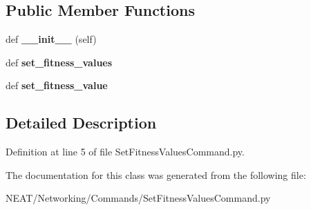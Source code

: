\subsection*{Public Member Functions}
\begin{DoxyCompactItemize}
\item 
def {\bfseries \+\_\+\+\_\+init\+\_\+\+\_\+} (self)\hypertarget{class_n_e_a_t___py_genetics_1_1_n_e_a_t_1_1_networking_1_1_commands_1_1_set_fitness_values_comma81a16061636d0840e697e190c694b7ad_af1878c6d7a7fcb3d42693ebf5ab9a8f9}{}\label{class_n_e_a_t___py_genetics_1_1_n_e_a_t_1_1_networking_1_1_commands_1_1_set_fitness_values_comma81a16061636d0840e697e190c694b7ad_af1878c6d7a7fcb3d42693ebf5ab9a8f9}

\item 
def {\bfseries set\+\_\+fitness\+\_\+values}\hypertarget{class_n_e_a_t___py_genetics_1_1_n_e_a_t_1_1_networking_1_1_commands_1_1_set_fitness_values_comma81a16061636d0840e697e190c694b7ad_ad422d62ec35756ac1375c71222e902ba}{}\label{class_n_e_a_t___py_genetics_1_1_n_e_a_t_1_1_networking_1_1_commands_1_1_set_fitness_values_comma81a16061636d0840e697e190c694b7ad_ad422d62ec35756ac1375c71222e902ba}

\item 
def {\bfseries set\+\_\+fitness\+\_\+value}\hypertarget{class_n_e_a_t___py_genetics_1_1_n_e_a_t_1_1_networking_1_1_commands_1_1_set_fitness_values_comma81a16061636d0840e697e190c694b7ad_a44c78bd4ea207b596aa62cf5e6ee5ebc}{}\label{class_n_e_a_t___py_genetics_1_1_n_e_a_t_1_1_networking_1_1_commands_1_1_set_fitness_values_comma81a16061636d0840e697e190c694b7ad_a44c78bd4ea207b596aa62cf5e6ee5ebc}

\end{DoxyCompactItemize}


\subsection{Detailed Description}


Definition at line 5 of file Set\+Fitness\+Values\+Command.\+py.



The documentation for this class was generated from the following file\+:\begin{DoxyCompactItemize}
\item 
N\+E\+A\+T/\+Networking/\+Commands/Set\+Fitness\+Values\+Command.\+py\end{DoxyCompactItemize}

